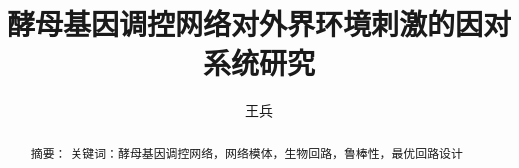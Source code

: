\documentclass[a4paper,12pt,twoside]{article}
\begin{document}
\begin{CJK*}{GBK}{song}                          %
\CJKtilde                                        %
\CJKindent                                       %
\title{酵母基因调控网络对外界环境刺激的因对系统研究}
\author{王兵}                                  
\maketitle                                       %
\begin{abstract}
摘要：
关键词：酵母基因调控网络，网络模体，生物回路，鲁棒性，最优回路设计
\end{abstract}
    


\end{CJK*}     %
\end{document}
